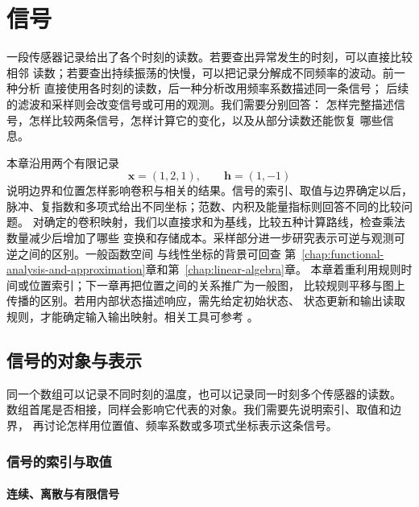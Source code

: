 \chapter{信号}
\label{chap:signal-analysis}

一段传感器记录给出了各个时刻的读数。若要查出异常发生的时刻，可以直接比较相邻
读数；若要查出持续振荡的快慢，可以把记录分解成不同频率的波动。前一种分析
直接使用各时刻的读数，后一种分析改用频率系数描述同一条信号；
后续的滤波和采样则会改变信号或可用的观测。我们需要分别回答：
怎样完整描述信号，怎样比较两条信号，怎样计算它的变化，以及从部分读数还能恢复
哪些信息。

本章沿用两个有限记录
\begin{equation}
  \bm x=(1,2,1),\qquad \bm h=(1,-1)
  \label{eq:signal-analysis-running-example}
\end{equation}
说明边界和位置怎样影响卷积与相关的结果。信号的索引、取值与边界确定以后，
脉冲、复指数和多项式给出不同坐标；范数、内积及能量指标则回答不同的比较问题。
对确定的卷积映射，我们以直接求和为基线，比较五种计算路线，检查乘法数量减少后增加了哪些
变换和存储成本。采样部分进一步研究表示可逆与观测可逆之间的区别。一般函数空间
与线性坐标的背景可回查
第~\ref{chap:functional-analysis-and-approximation}章和第~\ref{chap:linear-algebra}章。
本章着重利用规则时间或位置索引；下一章再把位置之间的关系推广为一般图，
比较规则平移与图上传播的区别。若用内部状态描述响应，需先给定初始状态、
状态更新和输出读取规则，才能确定输入输出映射。相关工具可参考
。

\section{信号的对象与表示}
\label{sec:signal-objects-structure}

同一个数组可以记录不同时刻的温度，也可以记录同一时刻多个传感器的读数。
数组首尾是否相接，同样会影响它代表的对象。我们需要先说明索引、取值和边界，
再讨论怎样用位置值、频率系数或多项式坐标表示这条信号。

\subsection{信号的索引与取值}

\subsubsection{连续、离散与有限信号}

